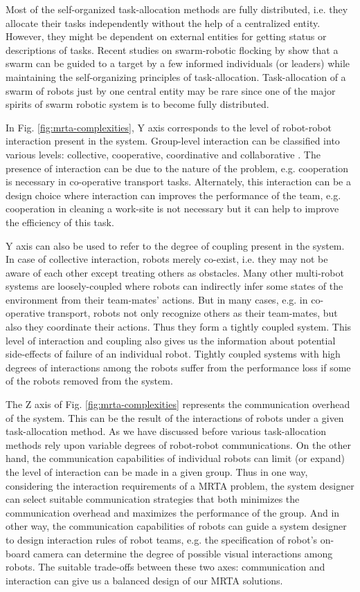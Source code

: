 \documentclass[preprint,12pt]{elsarticle}
\begin{document}
Most of the self-organized task-allocation methods are fully distributed, i.e. they allocate their tasks independently without the help of a centralized entity. However, they might be dependent on external entities for getting status or descriptions of tasks. Recent studies on swarm-robotic flocking by \citet{Celikkanat+2008} show that a swarm can be guided to a target by a few informed individuals (or leaders) while  maintaining the self-organizing principles of task-allocation. Task-allocation of a swarm of robots  just by one central entity may be rare since one of the major spirits of swarm robotic system is to become fully distributed.

In Fig. \ref{fig:mrta-complexities},  Y axis corresponds to the level of robot-robot interaction present in the system. Group-level interaction can be classified into various levels: collective, cooperative, coordinative and collaborative \cite{Parker2008}. The presence of interaction can be due to the nature of the problem, e.g. cooperation is necessary in co-operative transport tasks. Alternately, this interaction can be a design choice where interaction can improves the performance of the team, e.g. cooperation in cleaning a work-site is not necessary but it can help to improve the  efficiency of this task. 

Y axis can also be used to refer to the degree of coupling present in the system.  In case of collective interaction, robots merely co-exist, i.e.  they may not be aware of each other except treating others as obstacles. Many other multi-robot systems are loosely-coupled where robots can indirectly infer some states of the environment from their team-mates' actions.  But in many cases, e.g. in  co-operative transport, robots not only recognize others as their team-mates, but also they coordinate their actions. Thus they form a  tightly coupled system. This level of interaction and coupling also gives us the information about potential side-effects of failure of an individual robot. Tightly coupled systems with high degrees of interactions among the robots  suffer from the performance loss if some of the robots removed from the system.

The Z axis of Fig. \ref{fig:mrta-complexities} represents the communication overhead of the system. This can be the result of the interactions  of robots under a given task-allocation method. As we have discussed before various task-allocation methods rely upon variable degrees of robot-robot communications.  On the other hand, the communication capabilities of individual robots can limit (or expand) the level of interaction can be made  in a given group. Thus in one way, considering the interaction requirements of a MRTA problem, the system designer can  select suitable communication strategies that both minimizes the communication overhead and maximizes the performance of the group. And in other way, the communication capabilities of robots can guide a system designer to design interaction rules of robot teams, e.g. the specification of robot's on-board camera  can determine the degree of possible visual interactions among robots. The suitable trade-offs between these two axes: communication and interaction can give us a balanced design of our MRTA solutions.
\end{document}
